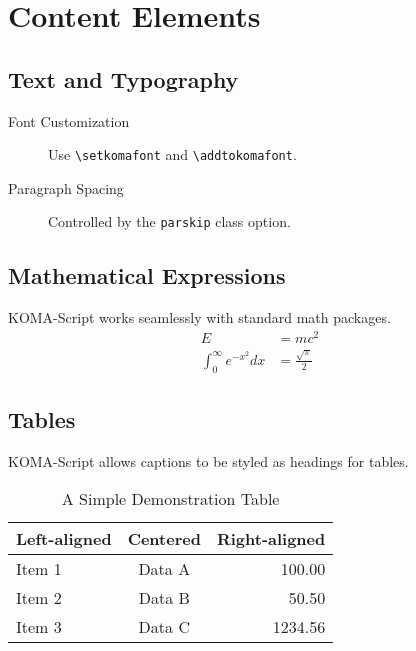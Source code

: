 \documentclass[
    a4paper,            %
    11pt,               %
    DIV=12,             %
    BCOR=5mm,           %
    twoside,            %
    headings=normal,    %
    toc=bibliography,   %
    toc=listof,         %
    listof=totoc,       %
    parskip=half,       %
    captions=tableheading, %
    numbers=autoendperiod, %
    appendixprefix=true,%
    chapterprefix=true, %
]{scrreprt}
\begin{document}
\chapter{Content Elements}
\section{Text and Typography}
\lipsum[6-7]
\begin{description}
  \item[Font Customization] Use \verb|\setkomafont| and \verb|\addtokomafont|.
  \item[Paragraph Spacing] Controlled by the \texttt{parskip} class option.
\end{description}

\section{Mathematical Expressions}
KOMA-Script works seamlessly with standard math packages.
\begin{align*}
  E                         & = mc^2                 \\
  \int_0^\infty e^{-x^2} dx & = \frac{\sqrt{\pi}}{2}
\end{align*}
\lipsum[8]

\section{Tables}
KOMA-Script allows captions to be styled as headings for tables.
\begin{table}[hbtp]
  \caption{A Simple Demonstration Table}\label{tab:simple}
  \begin{tabular}{lcr}
    \toprule
    Left-aligned & Centered & Right-aligned \\
    \midrule
    Item 1       & Data A   & 100.00        \\
    Item 2       & Data B   & 50.50         \\
    Item 3       & Data C   & 1234.56       \\
    \bottomrule
  \end{tabular}
\end{table}
\end{document}
